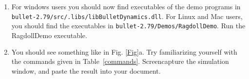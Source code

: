 \documentclass[12pt]{article}
\begin{document}
\begin{enumerate}

\item \label{post-install} For windows users you should now find executables of the demo
  programs in \\ \texttt{bullet-2.79/src/.libs/libBulletDynamics.dll}. For Linux and
  Mac users, you should find the executables in
  \texttt{bullet-2.79/Demos/RagdollDemo}. Run the RagdollDemo
  executable.

\item You should see something like in Fig. \ref{Fig}a. Try familiarizing yourself with the commands given in Table~\ref{commands}. Screencapture the simulation window, and paste the result into your document.


\end{enumerate}
\end{document}
